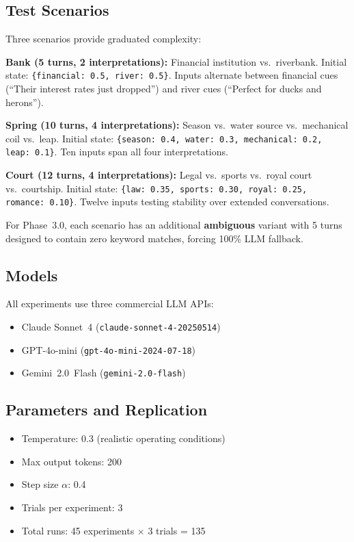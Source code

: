 \documentclass[11pt,a4paper]{article}
\begin{document}
\subsection{Test Scenarios}

Three scenarios provide graduated complexity:

\textbf{Bank (5 turns, 2 interpretations):}
Financial institution vs.\ riverbank. Initial state:
\texttt{\{financial: 0.5, river: 0.5\}}. Inputs alternate between financial cues
(``Their interest rates just dropped'') and river cues (``Perfect for ducks and herons'').

\textbf{Spring (10 turns, 4 interpretations):}
Season vs.\ water source vs.\ mechanical coil vs.\ leap. Initial state:
\texttt{\{season: 0.4, water: 0.3, mechanical: 0.2, leap: 0.1\}}. Ten inputs
span all four interpretations.

\textbf{Court (12 turns, 4 interpretations):}
Legal vs.\ sports vs.\ royal court vs.\ courtship. Initial state:
\texttt{\{law: 0.35, sports: 0.30, royal: 0.25, romance: 0.10\}}. Twelve inputs
testing stability over extended conversations.

For Phase~3.0, each scenario has an additional \textbf{ambiguous} variant with
5 turns designed to contain zero keyword matches, forcing 100\% LLM fallback.

\subsection{Models}

All experiments use three commercial LLM APIs:
\begin{itemize}
    \item Claude Sonnet~4 (\texttt{claude-sonnet-4-20250514})
    \item GPT-4o-mini (\texttt{gpt-4o-mini-2024-07-18})
    \item Gemini~2.0~Flash (\texttt{gemini-2.0-flash})
\end{itemize}

\subsection{Parameters and Replication}

\begin{itemize}
    \item Temperature: 0.3 (realistic operating conditions)
    \item Max output tokens: 200
    \item Step size $\alpha$: 0.4
    \item Trials per experiment: 3
    \item Total runs: 45 experiments $\times$ 3 trials = 135
\end{itemize}
\end{document}
